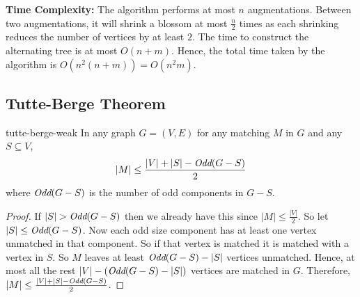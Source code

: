 \textbf{Time Complexity:} The algorithm performs at most $n$ augmentations. Between two augmentations, it will shrink a blossom at most $\frac{n}{2}$ times as each shrinking reduces the number of vertices by at least $2$. The time to construct the alternating tree is at most $O(n+m)$. Hence, the total time taken by the algorithm is $O(n^2(n+m))=O(n^2m)$. \parinn
\subsection{Tutte-Berge Theorem}
\begin{Theorem}{}{tutte-berge-weak}
	In any graph $G=(V,E)$ for any matching $M$ in $G$ and any $S\subseteq V$, $$|M|\leq\frac{|V|+|S|-\emph{Odd}(G-S)}2$$ where $\emph{Odd}(G-S)$ is the number of odd components in $G-S$.
\end{Theorem}
\begin{proof}
	If $|S|>\emph{Odd}(G-S)$ then we already have this since $|M|\leq\frac{|V|}{2}$. So let $|S|\leq \emph{Odd}(G-S)$. Now each odd size component has at least one vertex unmatched in that component. So if that vertex is matched it is matched with a vertex in $S$. So $M$ leaves at least $\emph{Odd}(G-S)-|S|$ vertices unmatched. Hence, at most all the rest $|V|-(\emph{Odd}(G-S)-|S|)$ vertices are matched in $G$. Therefore, $|M|\leq\frac{|V|+|S|-\emph{Odd}(G-S)}2$.
\end{proof}

